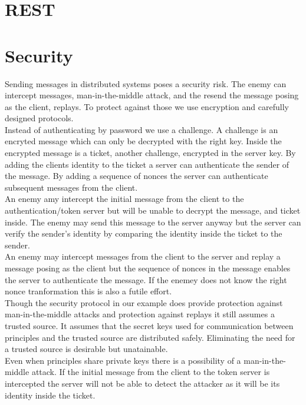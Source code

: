 \section{REST}
\section{Security}
Sending messages in distributed systems poses a security risk. The enemy can intercept messages, man-in-the-middle attack, and the resend the message posing as the client, replays. To protect against those we use encryption and carefully designed protocols. \\

Instead of authenticating by password we use a challenge. A challenge is an encryted message which can only be decrypted with the right key. Inside the encrypted message is a ticket, another challenge, encrypted in the server key. By adding the clients identity to the ticket a server can authenticate the sender of the message. By adding a sequence of nonces the server can authenticate subsequent messages from the client.\\

An enemy amy intercept the initial message from the client to the authentication/token server but will be unable to decrypt the message, and ticket inside. The enemy may send this message to the server anyway but the server can verify the sender's identity by comparing the identity inside the ticket to the sender. \\

An enemy may intercept messages from the client to the server and replay a message posing as the client but the sequence of nonces in the message enables the server to authenticate the message. If the enemey does not know the right nonce tranformation this is also a futile effort.\\

Though the security protocol in our example does provide protection against man-in-the-middle attacks and protection against replays it still assumes a trusted source. It assumes that the secret keys used for communication between principles and the trusted source are distributed safely. Eliminating the need for a trusted source is desirable but unatainable. \\

Even when principles share private keys there is a possibility of a man-in-the-middle attack. If the initial message from the client to the token server is intercepted the server will not be able to detect the attacker as it will be its identity inside the ticket. \\ 

